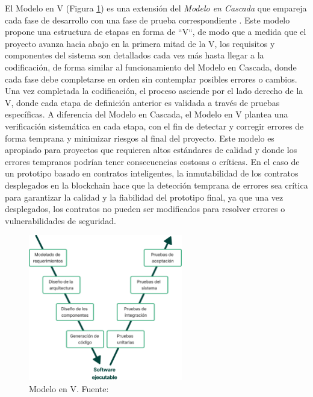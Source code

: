 El Modelo en V (Figura \ref{fig:model-v}) es una extensión del \textit{Modelo en Cascada} que empareja cada fase de desarrollo con una fase de prueba correspondiente \cite{pressman2010ingenieria}. Este modelo propone una estructura de etapas en forma de ``V``, de modo que a medida que el proyecto avanza hacia abajo en la primera mitad de la V, los requisitos y componentes del sistema son detallados cada vez más hasta llegar a la codificación, de forma similar al funcionamiento del Modelo en Cascada, donde cada fase debe completarse en orden sin contemplar posibles errores o cambios. Una vez completada la codificación, el proceso asciende por el lado derecho de la V, donde cada etapa de definición anterior es validada a través de pruebas específicas. A diferencia del Modelo en Cascada, el Modelo en V plantea una verificación sistemática en cada etapa, con el fin de detectar y corregir errores de forma temprana y minimizar riesgos al final del proyecto. Este modelo es apropiado para proyectos que requieren altos estándares de calidad y donde los errores tempranos podrían tener consecuencias costosas o críticas. En el caso de un prototipo basado en contratos inteligentes, la inmutabilidad de los contratos desplegados en la blockchain hace que la detección temprana de errores sea crítica para garantizar la calidad y la fiabilidad del prototipo final, ya que una vez desplegados, los contratos no pueden ser modificados para resolver errores o vulnerabilidades de seguridad.

\begin{figure}[!htb]
	\centering
	\includegraphics[width=0.6\textwidth]{Figures/model-v.png}
	\caption[Modelo en V]{Modelo en V. Fuente: \cite{pressman2010ingenieria}}
    \label{fig:model-v}
\end{figure}


